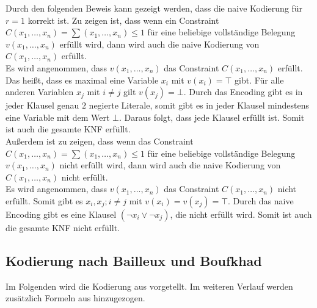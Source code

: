 \documentclass[a4,abstract=on]{scrartcl}
\begin{document}
Durch den folgenden Beweis kann gezeigt werden, dass die naive Kodierung für $r=1$ korrekt ist. Zu zeigen ist, dass wenn ein Constraint $C(x_1, \dots, x_n) = \sum(x_1, \dots,x_n) \leq 1$ für eine beliebige vollständige Belegung $v(x_1, \dots ,x_n)$ erfüllt wird, dann wird auch die naive Kodierung von $C(x_1, \dots, x_n)$ erfüllt.\\
Es wird angenommen, dass $v(x_1, \dots ,x_n)$ das Constraint $C(x_1, \dots, x_n)$ erfüllt. Das heißt, dass es maximal eine Variable $x_i$ mit $v(x_i) = \top$ gibt. Für alle anderen Variablen $x_j$ mit $i \neq j$ gilt $v(x_j) = \bot$. Durch das Encoding gibt es in jeder Klausel genau $2$ negierte Literale, somit gibt es in jeder Klausel mindestens eine Variable mit dem Wert $\bot$. Daraus folgt, dass jede Klausel erfüllt ist. Somit ist auch die gesamte KNF erfüllt.\\
Außerdem ist zu zeigen, dass wenn das Constraint $C(x_1, \dots, x_n) = \sum(x_1, \dots,x_n) \leq 1$ für eine beliebige vollständige Belegung $v(x_1, \dots ,x_n)$ nicht erfüllt wird, dann wird auch die naive Kodierung von $C(x_1, \dots, x_n)$ nicht erfüllt.\\
Es wird angenommen, dass $v(x_1, \dots ,x_n)$ das Constraint $C(x_1, \dots, x_n)$ nicht erfüllt. Somit gibt es $x_i, x_j; i \neq j$ mit $v(x_i) = v(x_j) = \top$. Durch das naive Encoding gibt es eine Klausel $(\neg x_i \vee \neg x_j)$, die nicht erfüllt wird. Somit ist auch die gesamte KNF nicht erfüllt.


	\subsection{Kodierung nach Bailleux und Boufkhad}
Im Folgenden wird die Kodierung aus \cite[][]{bailleux} vorgetellt. Im weiteren Verlauf werden zusätzlich Formeln aus \cite[][]{knuth} hinzugezogen.
\end{document}
